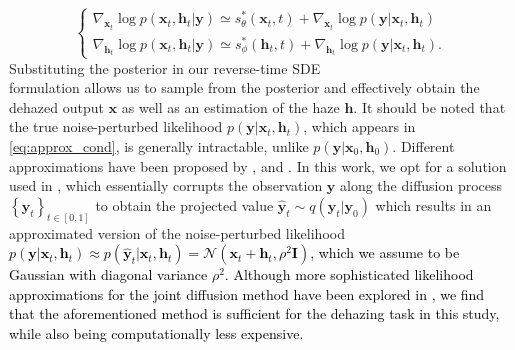 \documentclass[journal,twoside,web]{ieeecolor}
\newcommand{\bx}{{\mathbf x}}
\newcommand{\by}{{\mathbf y}}
\newcommand{\bh}{{\mathbf h}}
\newcommand{\bI}{{\mathbf I}}
\newcommand{\TSW}[1]{{\textcolor{black}{#1}}}
\begin{document}
\begin{equation}
\label{eq:approx_cond}
    \left\{
        \begin{array}{lr}
                \nabla_{\bx_t}\log{p(\bx_t, \bh_t|\by)} \simeq s_\theta^*(\bx_t, t) + \nabla_{\bx_t} \log{p(\by|\bx_t, \bh_t)}
                \\[4pt]
                \nabla_{\bh_t}\log{p(\bx_t, \bh_t|\by)} \simeq s_\phi^*(\bh_t, t) + \nabla_{\bh_t} \log{p(\by|\bx_t, \bh_t)}.
        \end{array}
    \right.
\end{equation}
Substituting the posterior in our reverse-time SDE\\ formulation allows us to sample from the posterior and effectively obtain the dehazed output $\bx$ as well as an estimation of the haze $\bh$. It should be noted that the true noise-perturbed likelihood $p(\by|\bx_t, \bh_t)$, which appears in \eqref{eq:approx_cond}, is generally intractable, unlike $p(\by|\bx_0, \bh_0)$. Different approximations have been proposed by \cite{chungDiffusionPosteriorSampling2023}, \cite{mengDiffusionModelBased2023} and \cite{fengScoreBasedDiffusionModels2023}. In this work, we opt for a solution used in \cite{songScoreBasedGenerativeModeling2021}, which essentially corrupts the observation $\by$ along the diffusion process $\left\{\by_t\right\}_{t\in[0,1]}$ to obtain the projected value $\hat{\by}_t\sim q(\by_t|\by_0)$ which results in an approximated version of the noise-perturbed likelihood \TSW{$p(\by|\bx_t, \bh_t) \approx p(\hat{\by}_t|\bx_t, \bh_t) = \mathcal{N}(\bx_t + \bh_t, \rho^2 \bI)$, which we assume to be Gaussian with diagonal variance $\rho^2$. Although more sophisticated likelihood approximations for the joint diffusion method have been explored in \cite{stevensRemovingStructuredNoise2023}, we find that the aforementioned method is sufficient for the dehazing task in this study, while also being computationally less expensive.}
\end{document}
